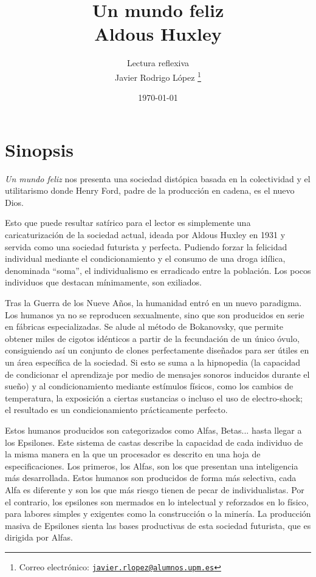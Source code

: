 \documentclass[11pt]{article}
\title{\Huge Un mundo feliz\\\vspace*{5pt}
\Large Aldous Huxley}
\author{Lectura reflexiva\\\vspace*{5pt}Javier Rodrigo López \thanks{Correo electrónico: \href{mailto:javier.rlopez@alumnos.upm.es}{\texttt{javier.rlopez@alumnos.upm.es}}}}
\date{\today}
\begin{document}
\maketitle
\tableofcontents
\newpage

\section{Sinopsis}

\textit{Un mundo feliz} nos presenta una sociedad distópica basada en la colectividad y el utilitarismo donde Henry Ford, padre de la producción en cadena, es el nuevo Dios.

Esto que puede resultar satírico para el lector es simplemente una caricaturización de la sociedad actual, ideada por Aldous Huxley en 1931 y servida como una sociedad futurista y perfecta. Pudiendo forzar la felicidad individual mediante el condicionamiento y el consumo de una droga idílica, denominada ``soma'', el individualismo es erradicado entre la población. Los pocos individuos que destacan mínimamente, son exiliados.

Tras la Guerra de los Nueve Años, la humanidad entró en un nuevo paradigma. Los humanos ya no se reproducen sexualmente, sino que son producidos en serie en fábricas especializadas. Se alude al método de Bokanovsky, que permite obtener miles de cigotos idénticos a partir de la fecundación de un único óvulo, consiguiendo así un conjunto de clones perfectamente diseñados para ser útiles en un área específica de la sociedad. Si esto se suma a la hipnopedia (la capacidad de condicionar el aprendizaje por medio de mensajes sonoros inducidos durante el sueño) y al condicionamiento mediante estímulos físicos, como los cambios de temperatura, la exposición a ciertas sustancias o incluso el uso de electro-shock; el resultado es un condicionamiento prácticamente perfecto.

Estos humanos producidos son categorizados como Alfas, Betas... hasta llegar a los Epsilones. Este sistema de castas describe la capacidad de cada individuo de la misma manera en la que un procesador es descrito en una hoja de especificaciones. Los primeros, los Alfas, son los que presentan una inteligencia más desarrollada. Estos humanos son producidos de forma más selectiva, cada Alfa es diferente y son los que más riesgo tienen de pecar de individualistas. Por el contrario, los epsilones son mermados en lo intelectual y reforzados en lo físico, para labores simples y exigentes como la construcción o la minería. La producción masiva de Epsilones sienta las bases productivas de esta sociedad futurista, que es dirigida por Alfas.
\end{document}
